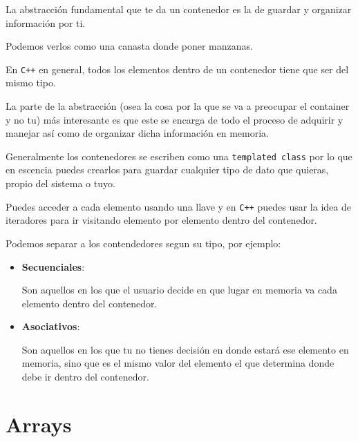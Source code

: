 \documentclass[12pt, fleqn]{report}                             %
\theoremstyle{break}                                            %
\newcommand{\textCode}[1]  { \texttt{#1} }                      %
\newcommand{\Cpp}{\ignorespaces\textCode{C++}}                  %
\begin{document}
            La abstracción fundamental que te da un contenedor es la de guardar y organizar
            información por ti.

            Podemos verlos como una canasta donde poner manzanas.
            
            En \Cpp en general, todos los elementos dentro de un contenedor tiene que ser del
            mismo tipo.

            La parte de la abstracción (osea la cosa por la que se va a preocupar el container 
            y no tu) más interesante es que este se encarga de todo el proceso de adquirir y manejar
            así como de organizar dicha información en memoria.

            Generalmente los contenedores se escriben como una \textCode{templated class} por lo
            que en escencia puedes crearlos para guardar cualquier tipo de dato que quieras, propio del
            sistema o tuyo.

            Puedes acceder a cada elemento usando una llave y en \Cpp puedes usar
            la idea de iteradores para ir visitando elemento por elemento dentro del contenedor.

            Podemos separar a los contendedores segun su tipo, por ejemplo:
            \begin{itemize}
                \item \textbf{Secuenciales}:
                
                    Son aquellos en los que el usuario decide en que lugar en memoria
                    va cada elemento dentro del contenedor.

                \item \textbf{Asociativos}:
                
                    Son aquellos en los que tu no tienes decisión en donde estará ese
                    elemento en memoria, sino que es el mismo valor del elemento el
                    que determina donde debe ir dentro del contenedor.
            \end{itemize}


    \clearpage
    \chapter{Arrays}
\end{document}
